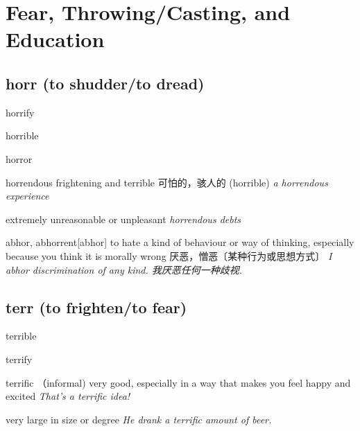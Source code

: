 \chapter{Fear, Throwing/Casting, and Education}

\section{horr (to shudder/to dread)}

\begin{DefWord}{horrify}
\end{DefWord}

\begin{DefWord}{horrible}
\end{DefWord}

\begin{DefWord}{horror}
\end{DefWord}

\begin{DefWord}{horrendous}
    frightening and terrible 可怕的，骇人的 (horrible)
    \textit{a horrendous experience}

    extremely unreasonable or unpleasant
    \textit{horrendous debts}
\end{DefWord}

\begin{DefWord}{abhor, abhorrent}[abhor]
    to hate a kind of behaviour or way of thinking, especially because you think it is morally wrong 厌恶，憎恶〔某种行为或思想方式〕
 \textit{I abhor discrimination of any kind. 我厌恶任何一种歧视. }
\end{DefWord}







\section{terr (to frighten/to fear)}

\begin{DefWord}{terrible}
\end{DefWord}

\begin{DefWord}{terrify}
\end{DefWord}

\begin{DefWord}{terrific}
    （informal) very good, especially in a way that makes you feel happy and excited
    \textit{That's a terrific idea!}

    very large in size or degree
    \textit{He drank a terrific amount of beer.}
\end{DefWord}

